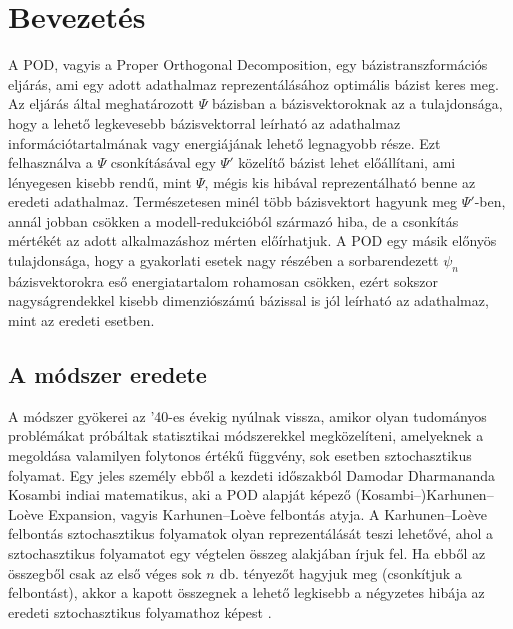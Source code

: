 
\newcommand\adj[1]{#1^{\mathrm{H}}}

\author{Szilágyi Gábor \\\vspace{2cm}\\ Konzulens: Dr. Bilicz Sándor}
\date{Budapest, \today}



    \maketitle
    \setcounter{page}{2}
    \tableofcontents
    \section{Bevezetés}
            A POD, vagyis a Proper Orthogonal Decomposition, egy bázistranszformációs eljárás, ami egy adott adathalmaz reprezentálásához optimális bázist keres meg. Az eljárás által meghatározott $\Psi$ bázisban a bázisvektoroknak az a tulajdonsága, hogy a lehető legkevesebb bázisvektorral leírható az adathalmaz információtartalmának vagy energiájának lehető legnagyobb része. Ezt felhasználva a $\Psi$ csonkításával egy $\Psi'$ közelítő bázist lehet előállítani, ami lényegesen kisebb rendű, mint $\Psi$, mégis kis hibával reprezentálható benne az eredeti adathalmaz. Természetesen minél több bázisvektort hagyunk meg $\Psi'$-ben, annál jobban csökken a modell-redukcióból származó hiba, de a csonkítás mértékét az adott alkalmazáshoz mérten előírhatjuk. A POD egy másik előnyös tulajdonsága, hogy a gyakorlati esetek nagy részében a sorbarendezett $\psi_n$ bázisvektorokra eső energiatartalom rohamosan csökken, ezért sokszor nagyságrendekkel kisebb dimenziószámú bázissal is jól leírható az adathalmaz, mint az eredeti esetben.
        \subsection{A módszer eredete}
            A módszer gyökerei az '40-es évekig nyúlnak vissza, amikor olyan tudományos problémákat próbáltak statisztikai módszerekkel megközelíteni, amelyeknek a megoldása valamilyen folytonos értékű függvény, sok esetben sztochasztikus folyamat. Egy jeles személy ebből a kezdeti időszakból Damodar Dharmananda Kosambi \cite{Kosambi11} indiai matematikus, aki a POD alapját képező (Kosambi--)Karhunen–Lo\`eve Expansion, vagyis Karhunen–Lo\`eve felbontás atyja. A Karhunen–Lo\`eve felbontás sztochasztikus folyamatok olyan reprezentálását teszi lehetővé, ahol a sztochasztikus folyamatot egy végtelen összeg alakjában írjuk fel. Ha ebből az összegből csak az első véges sok $n$ db. tényezőt hagyjuk meg (csonkítjuk a felbontást), akkor a kapott összegnek a lehető legkisebb a négyzetes hibája az eredeti sztochasztikus folyamathoz képest \cite{Aadithya18}.
            \par
            
